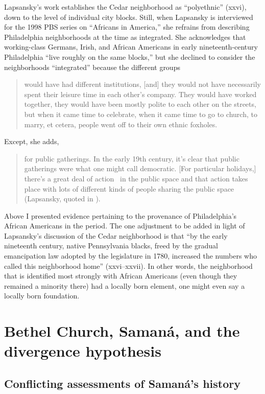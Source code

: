 \documentclass[output=paper,colorlinks,citecolor=brown]{langscibook}
\begin{document}
Lapsansky’s work establishes the Cedar neighborhood as “polyethnic” (xxvi), down to the level of individual city blocks. Still, when Lapsansky is interviewed for the 1998 PBS series on “Africans in America,” she refrains from describing Philadelphia neighborhoods at the time as integrated. She acknowledges that working-class Germans, Irish, and African Americans in early nineteenth-cen\-tu\-ry Philadelphia “live roughly on the same blocks,” but she declined to consider the neighborhoods “integrated” because the different groups 

\begin{quote}would have had different institutions, [and] they would not have necessarily spent their leisure time in each other’s company. They would have worked together, they would have been mostly polite to each other on the streets, but when it came time to celebrate, when it came time to go to church, to marry, et cetera, people went off to their own ethnic foxholes. 
\end{quote}

Except, she adds, 
 \begin{quote}for public gatherings. In the early 19th century, it's clear that public gatherings were what one might call democratic. [For particular holidays,] there's a great deal of action ~in the public space and that action takes place with lots of different kinds of people sharing the public space
(Lapsansky, quoted in \citealt{Jones1998}).\end{quote}

Above I presented evidence pertaining to the provenance of Philadelphia’s African Americans in the period. The one adjustment to be added in light of Lapsansky’s discussion of the Cedar neighborhood is that “by the early nineteenth century, native Pennsylvania blacks, freed by the gradual emancipation law adopted by the legislature in 1780, increased the numbers who called this neighborhood home” (xxvi–xxvii). In other words, the neighborhood that is identified most strongly with African Americans (even though they remained a minority there) had a locally born element, one might even say a locally born foundation.

\section{Bethel Church, {Samaná}, and the divergence hypothesis} \label{section5}
\subsection{Conflicting assessments of {Samaná’s} history}
\end{document}
